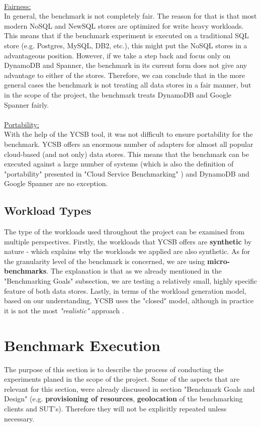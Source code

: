 \documentclass[letterpaper, 10 pt, conference]{ieeeconf}  %
\begin{document}
\\
\underline{Fairness:}
\\
In general, the benchmark is not completely fair. The reason for that is that most modern NoSQL and NewSQL stores are optimized for write heavy workloads. This means that if the benchmark experiment is executed on a traditional SQL store (e.g. Postgres, MySQL, DB2, etc.), this might put the NoSQL stores in a advantageous position. However, if we take a step back and focus only on DynamoDB and Spanner, the benchmark in its current form does not give any advantage to either of the stores. Therefore, we can conclude that in the more general cases the benchmark is not treating all data stores in a fair manner, but in the scope of the project, the benchmark treats DynamoDB and Google Spanner fairly.
\\
\\
\underline{Portability:}
\\
With the help of the YCSB tool, it was not difficult to ensure portability for the benchmark. YCSB offers an enormous number of adapters for almost all popular cloud-based (and not only) data stores. This means that the benchmark can be executed against a large number of systems (which is also the definition of "portability" presented in "Cloud Service Benchmarking" \cite{StefanTaiBook}) and DynamoDB and Google Spanner are no exception.

\subsection{Workload Types}
The type of the workloads used throughout the project can be examined from multiple perspectives. Firstly, the workloads that YCSB offers are \textbf{synthetic} by nature - which explains why the workloads we applied are also synthetic. As for the granularity level of the benchmark is concerned, we are using \textbf{micro-benchmarks}. The explanation is that as we already mentioned in the "Benchmarking Goals" subsection, we are testing a relatively small, highly specific feature of both data stores. Lastly, in terms of the workload generation model, based on our understanding, YCSB uses the "closed" model, although in practice it is not the most \textit{"realistic"} approach \cite{StefanTaiBook}.

\section{Benchmark Execution}
The purpose of this section is to describe the process of conducting the experiments planed in the scope of the project. Some of the aspects that are relevant for this section, were already discussed in section "Benchmark Goals and Design" (e.g. \textbf{provisioning of resources}, \textbf{geolocation} of the benchmarking clients and SUT's). Therefore they will not be explicitly repeated unless necessary.
\end{document}
